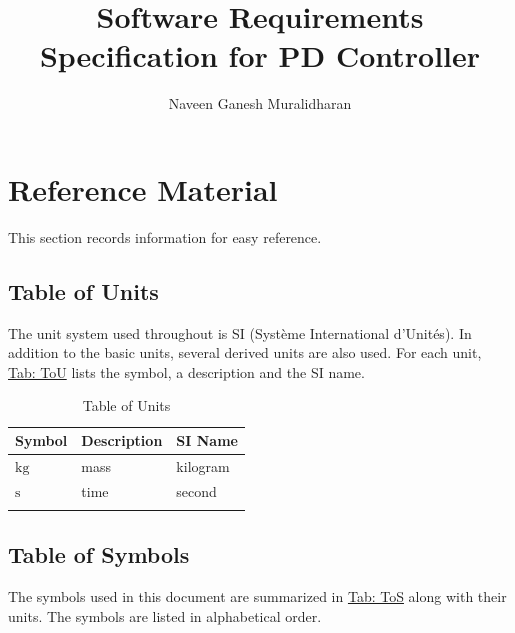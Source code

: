 \documentclass[12pt]{article}
\title{Software Requirements Specification for PD Controller}
\author{Naveen Ganesh Muralidharan}
\begin{document}
\maketitle
\tableofcontents
\newpage
\section{Reference Material}
\label{Sec:RefMat}
This section records information for easy reference.

\subsection{Table of Units}
\label{Sec:ToU}
The unit system used throughout is SI (Système International d'Unités). In addition to the basic units, several derived units are also used. For each unit, \hyperref[Table:ToU]{Tab: ToU} lists the symbol, a description and the SI name.

\begin{longtable}{l l l}
\toprule
\textbf{Symbol} & \textbf{Description} & \textbf{SI Name}
\\
\midrule
\endhead
${\text{kg}}$ & mass & kilogram
\\
${\text{s}}$ & time & second
\\
\bottomrule
\caption{Table of Units}
\label{Table:ToU}
\end{longtable}
\subsection{Table of Symbols}
\label{Sec:ToS}
The symbols used in this document are summarized in \hyperref[Table:ToS]{Tab: ToS} along with their units. The symbols are listed in alphabetical order.
\end{document}
